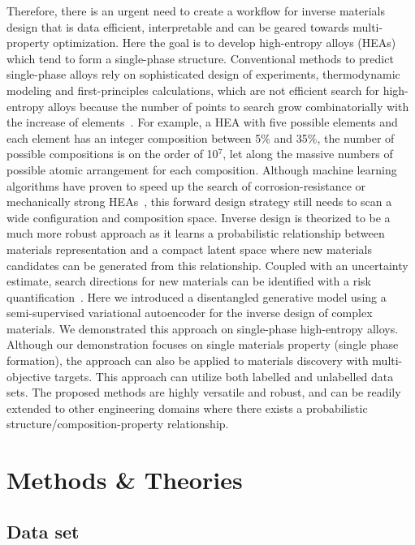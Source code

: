 \documentclass[a4paper]{article}
\begin{document}
Therefore, there is an urgent need to create a workflow for inverse materials design that is data efficient, interpretable and can be geared towards multi-property optimization.
Here the goal is to develop high-entropy alloys (HEAs) which tend to form a single-phase structure.
Conventional methods to predict single-phase alloys rely on sophisticated design of experiments, thermodynamic modeling and first-principles calculations, which are not efficient search for high-entropy alloys  because the number of points to search grow combinatorially with the increase of elements~\cite{yao2017, feng2021}.
For example, a HEA with five possible elements and each element has an integer composition between 5\% and 35\%, the number of possible compositions is on the order of 10$^7$, let along the massive numbers of possible atomic arrangement for each composition.
Although machine learning algorithms have proven to speed up the search of corrosion-resistance or mechanically strong HEAs~\cite{zeng2024, yan2021, tandoc2023}, this forward design strategy still needs to scan a wide configuration and composition space.
Inverse design is theorized to be a much more robust approach as it learns a probabilistic relationship between materials representation and a compact latent space where new materials candidates can be generated from this relationship.
Coupled with an uncertainty estimate, search directions for new materials can be identified with a risk quantification~\cite{rao2022}.
Here we introduced a disentangled generative model using a semi-supervised variational autoencoder for the inverse design of complex materials.
We demonstrated this approach on single-phase high-entropy alloys.
Although our demonstration focuses on single materials property (single phase formation), the approach can also be applied to materials discovery with multi-objective targets.
This approach can utilize both labelled and unlabelled data sets. The proposed methods are highly versatile and robust, and can be readily extended to other engineering domains where there exists a probabilistic structure/composition-property relationship.

\section{Methods \& Theories}
\subsection{Data set}
\end{document}
